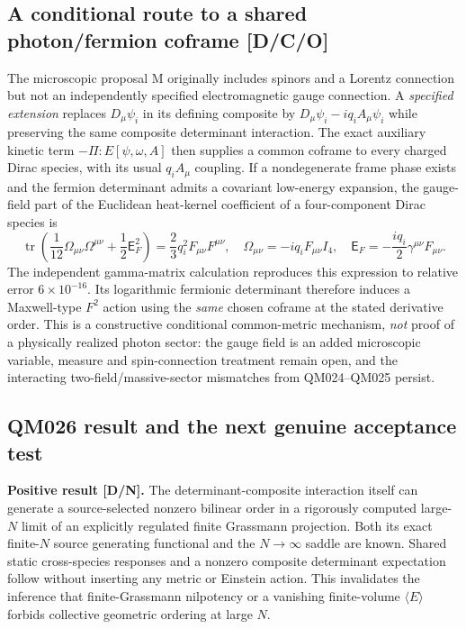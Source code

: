 \documentclass[11pt,a4paper]{article}
\begin{document}
\subsection{A conditional route to a shared photon/fermion coframe [D/C/O]}
\label{sec:v16-gaugefield}
The microscopic proposal M originally includes spinors and a Lorentz connection but not an independently specified electromagnetic gauge connection. A \emph{specified extension} replaces $D_\mu\psi_i$ in its defining composite by $D_\mu\psi_i-iq_i A_\mu\psi_i$ while preserving the same composite determinant interaction. The exact auxiliary kinetic term $-\Pi:E[\psi,\omega,A]$ then supplies a common coframe to every charged Dirac species, with its usual $q_iA_\mu$ coupling. If a nondegenerate frame phase exists and the fermion determinant admits a covariant low-energy expansion, the gauge-field part of the Euclidean heat-kernel coefficient of a four-component Dirac species is
\begin{equation}\label{eq:v16-a4}
\boxed{\operatorname{tr}\left(\frac1{12}\Omega_{\mu\nu}\Omega^{\mu\nu}
+\frac12\mathsf E_F^2\right)
=\frac23 q_i^2 F_{\mu\nu}F^{\mu\nu},\quad
\Omega_{\mu\nu}=-iq_iF_{\mu\nu}I_4,\quad
\mathsf E_F=-\frac{iq_i}{2}\gamma^{\mu\nu}F_{\mu\nu}.}
\end{equation}
The independent gamma-matrix calculation reproduces this expression to relative error $6\times10^{-16}$. Its logarithmic fermionic determinant therefore induces a Maxwell-type $F^2$ action using the \emph{same} chosen coframe at the stated derivative order. This is a constructive conditional common-metric mechanism, \emph{not} proof of a physically realized photon sector: the gauge field is an added microscopic variable, measure and spin-connection treatment remain open, and the interacting two-field/massive-sector mismatches from QM024--QM025 persist.

\subsection{QM026 result and the next genuine acceptance test}
\label{sec:v16-verdict}
\textbf{Positive result [D/N].} The determinant-composite interaction itself can generate a source-selected nonzero bilinear order in a rigorously computed large-$N$ limit of an explicitly regulated finite Grassmann projection. Both its exact finite-$N$ source generating functional and the $N\to\infty$ saddle are known. Shared static cross-species responses and a nonzero composite determinant expectation follow without inserting any metric or Einstein action. This invalidates the inference that finite-Grassmann nilpotency or a vanishing finite-volume $\langle E\rangle$ forbids collective geometric ordering at large $N$.
\end{document}
